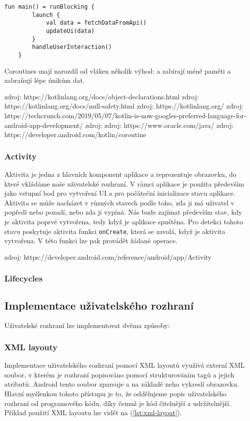 \begin{lstlisting}[caption={Praktický příklad použití coroutiny}, label={lst:coroutine-practical}, tabsize=2]
	fun main() = runBlocking {
		launch {
			val data = fetchDataFromApi()
			updateUi(data)
		}
		handleUserInteraction()
	}
\end{lstlisting}

Coroutines mají narozdíl od vláken několik výhod: a zabírají méně paměti a zabraňují lépe únikům dat. 

zdroj: https://kotlinlang.org/docs/object-declarations.html
zdroj: https://kotlinlang.org/docs/null-safety.html
zdroj: https://kotlinlang.org/
zdroj: https://techcrunch.com/2019/05/07/kotlin-is-now-googles-preferred-language-for-android-app-development/
zdroj: zdroj: https://www.oracle.com/java/
zdroj: https://developer.android.com/kotlin/coroutine

\subsubsection*{Activity}
Aktivita je jedna z hlavních komponent aplikace a reprezentuje obrazovku, do které vkládáme naše uživatelské rozhraní. V rámci aplikace je použita především jako vstupní bod pro vytvoření UI a pro počáteční inicializace stavu aplikace. Aktivita se může nacházet v různých stavech podle toho, zda ji má uživatel v popředí nebo pozadí, nebo zda ji vypíná. Nás bude zajímat především stav, kdy je aktivita poprvé vytvořena, tedy když je aplikace spuštěna. Pro detekci tohoto stavu poskytuje aktivita funkci \lstinline|onCreate|, která se zavolá, když je aktivita vytvořena. V této funkci lze pak provádět žádané operace.

zdroj: https://developer.android.com/reference/android/app/Activity

\subsubsection*{Lifecycles}

\subsection {Implementace uživatelského rozhraní}
Uživatelské rozhraní lze implementovat dvěma způsoby:

\subsubsection*{XML layouty}
Implementace uživatelského rozhraní pomocí XML layoutů využívá externí XML soubor, v kterém je rozhraní popisováno pomocí strukturováním tagů a jejich atributů. Android tento soubor zparsuje a na základě neho vykreslí obrazovku. Hlavní myšlenkou tohoto přístupu je to, že oddělujeme popis uživatelského rozhraní od programového kódu, díky čemuž je kód čitelnější a udržitelnější. Příklad použití XML layoutu lze vidět na (\ref{lst:xml-layout}).

